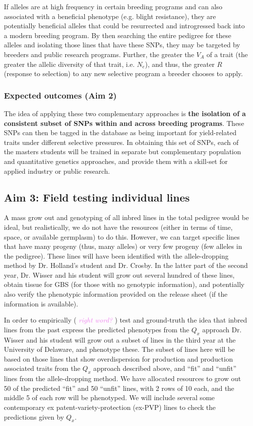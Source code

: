 \documentclass[12pt]{article}
\newcommand{\kc}[1]{\textcolor{violet}{ \emph{\scriptsize  #1}} }
\begin{document}
{If alleles are at high frequency in certain breeding programs and can also associated with a beneficial phenotype (e.g. blight resistance), they are potentially beneficial alleles that could be resurrected and introgressed back into a modern breeding program. 
By then searching the entire pedigree for these alleles and isolating those lines that have these SNPs, they may be targeted by breeders and public research programs.
Further, the greater the $V_A$ of a trait (the greater the allelic diversity of that trait, i.e. $N_{e}$), and thus, the greater $R$ (response to selection) to any new selective program a breeder chooses to apply.


\subsubsection*{Expected outcomes (Aim 2)}

The idea of applying these two complementary approaches is \textbf{the isolation of a consistent subset of SNPs within and across breeding programs}. 
These SNPs can then be tagged in the database as being important for yield-related traits under different selective pressures.
In obtaining this set of SNPs, each of the masters students will be trained in separate but complementary population and quantitative genetics approaches, and provide them with a skill-set for applied industry or public research. 


\subsection*{Aim 3: Field testing individual lines}
A mass grow out and genotyping of all inbred lines in the total pedigree would be ideal, but realistically, we do not have the resources (either in terms of time, space, or available germplasm) to do this.
However, we can target specific lines that have many progeny (thus, many alleles) or very few progeny (few alleles in the pedigree). These lines will have been identified with the allele-dropping method by Dr. Holland's student and Dr. Crosby. 
In the latter part of the second year, Dr. Wisser and his student will grow out several hundred of these lines, obtain tissue for GBS (for those with no genotypic information), and potentially also verify the phenotypic information provided on the release sheet (if the information is available). 

In order to empirically (\kc{right word?}) test and ground-truth the idea that inbred lines from the past express the predicted phenotypes from the $Q_{x}$ approach Dr. Wisser and his student will grow out a subset of lines in the third year at the University of Delaware, and phenotype these.
The subset of lines here will be based on those lines that show overdispersion for production and production associated traits from the $Q_{x}$ approach described above, and ``fit'' and ``unfit'' lines from the allele-dropping method. 
We have allocated resources to grow out 50 of the predicted ``fit'' and 50 ``unfit'' lines, with 2 rows of 10 each, and the middle 5 of each row will be phenotyped. 
We will include several some contemporary ex patent-variety-protection (ex-PVP) lines to check the predictions given by $Q_{x}$.


}
\end{document}
